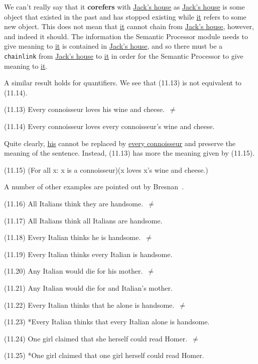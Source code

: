 \documentclass{article}
\begin{document}
We can't really say that it \textbf{corefers} with
\underline{Jack's house} as \underline{Jack's house} is some
object that existed in the past and has stopped existing while
\underline{it} refers to some new object.  This does not mean
that \underline{it} cannot chain from \underline{Jack's house},
however, and indeed it should. The information the Semantic
Processor module needs to give meaning to \underline{it} is
contained in \underline{Jack's house}, and so there must be a
\texttt{chainlink} from \underline{Jack's house} to
\underline{it} in order for the Semantic Processor to give
meaning to \underline{it}.

A similar result holds for quantifiers. We see that (11.13) is
not equivalent to (11.14).

\begin{enumerate*}
\item[(11.13)] Every connoisseur loves his wine and cheese.~${\ne}$
\item[(11.14)] Every connoisseur loves every connoisseur's wine
and cheese.
\end{enumerate*}

Quite clearly, \underline{his} cannot be replaced by
\underline{every connoisseur} and preserve the meaning of the
sentence.  Instead, (11.13) has more the meaning given by
(11.15).

\begin{enumerate*}
\item[(11.15)] (For all x: x is a connoisseur)(x loves x's wine
and cheese.)
\end{enumerate*}

A number of other examples are pointed out by
Bresnan~\cite{Bresnan71}.

\begin{enumerate*}
\item[(11.16)] All Italians think they are handsome.~${\ne}$
\item[(11.17)] All Italians think all Italians are handsome.
\item[(11.18)] Every Italian thinks he is handsome.~${\ne}$
\item[(11.19)] Every Italian thinks every Italian is handsome.
\item[(11.20)] Any Italian would die for his mother.~${\ne}$
\item[(11.21)] Any Italian would die for and Italian's mother.
\item[(11.22)] Every Italian thinks that he alone is
handsome.~${\ne}$
\item[(11.23)] *Every Italian thinks that every Italian alone
is handsome.
\item[(11.24)] One girl claimed that she herself could read
Homer.~${\ne}$
\item[(11.25)] *One girl claimed that one girl herself could
read Homer.
\end{enumerate*}
\end{document}
